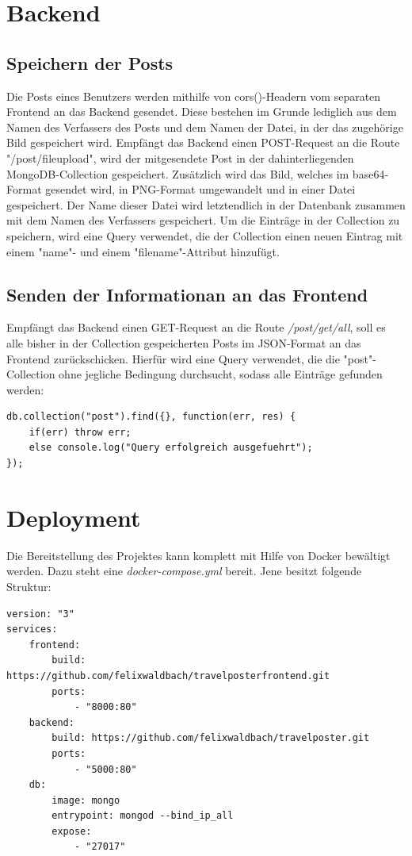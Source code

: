\documentclass[12pt,a4paper]{report}
\begin{document}
\section{Backend}

\subsection{Speichern der Posts}
Die Posts eines Benutzers werden mithilfe von cors()-Headern vom separaten Frontend an das Backend gesendet. Diese bestehen im Grunde lediglich aus dem Namen des Verfassers des Posts und dem Namen der Datei, in der das zugehörige Bild gespeichert wird. Empfängt das Backend einen POST-Request an die Route "/post/fileupload", wird der mitgesendete Post in der dahinterliegenden MongoDB-Collection gespeichert. Zusätzlich wird das Bild, welches im base64-Format gesendet wird, in PNG-Format umgewandelt und in einer Datei gespeichert. Der Name dieser Datei wird letztendlich in der Datenbank zusammen mit dem Namen des Verfassers gespeichert.
Um die Einträge in der Collection zu speichern, wird eine Query verwendet, die der Collection einen neuen Eintrag mit einem "name"- und einem "filename"-Attribut hinzufügt.

\subsection{Senden der Informationan an das Frontend}
Empfängt das Backend einen GET-Request an die Route \textit{/post/get/all}, soll es alle bisher in der Collection gespeicherten Posts im JSON-Format an das Frontend zurückschicken. Hierfür wird eine Query verwendet, die die "post"-Collection ohne jegliche Bedingung durchsucht, sodass alle Einträge gefunden werden:

\begin{verbatim}
db.collection("post").find({}, function(err, res) {
    if(err) throw err;
    else console.log("Query erfolgreich ausgefuehrt");
});
\end{verbatim}

\section{Deployment}
Die Bereitstellung des Projektes kann komplett mit Hilfe von Docker bewältigt werden. Dazu steht eine \textit{docker-compose.yml} bereit. Jene besitzt folgende Struktur:

\begin{verbatim}
version: "3"
services:
    frontend:
        build: https://github.com/felixwaldbach/travelposterfrontend.git
        ports:
            - "8000:80"
    backend:
        build: https://github.com/felixwaldbach/travelposter.git
        ports:
            - "5000:80"
    db:
        image: mongo
        entrypoint: mongod --bind_ip_all
        expose: 
            - "27017"
\end{verbatim}
\end{document}

